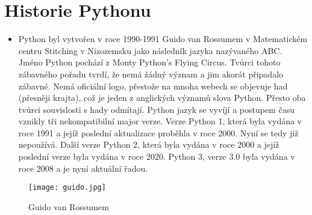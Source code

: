 \documentclass[12pt,a4paper]{article}
\begin{document}
\section{Historie Pythonu}
\begin{itemize}
    \item Python byl vytvořen v roce 1990-1991 Guido van Rossumem v Matematickém centru Stitching v Nizozemsku jako následník jazyka nazývaného ABC. Jméno Python pochází z Monty Python's Flying Circus. Tvůrci tohoto zábavného pořadu tvrdí, že nemá žádný význam a jim akorát připadalo zábavné. Nemá oficiální logo, přestože na mnoha webech se objevuje had (přesněji krajta), což je jeden z anglických významů slova Python. Přesto oba tvůrci souvislosti s hady odmítají. Python jazyk se vyvíjí a postupem času vznikly tři nekompatibilní major verze. Verze Python 1, která byla vydána v roce 1991 a jejíž poslední aktualizace proběhla v roce 2000. Nyní se tedy již nepoužívá. Další verze Python 2, která byla vydána v roce 2000 a jejíž poslední verze byla vydána v roce 2020. Python 3, verze 3.0 byla vydána v roce 2008 a je nyní aktuální řadou.
\end{itemize}
\begin{figure}[h]
    \centering
    \texttt{[image: guido.jpg]}
    \caption{Guido van Rossumem}
    \end{figure}
\end{document}
